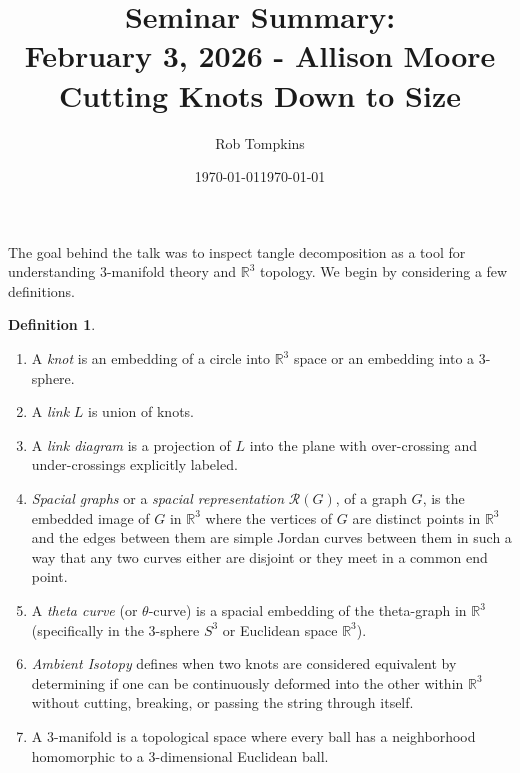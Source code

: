 \documentclass[12pt]{amsart}
\title{Seminar Summary:\\February 3, 2026 - Allison Moore\\Cutting Knots Down to Size}
\author{Rob Tompkins}
\date{\today}
\theoremstyle{definition}
\newtheorem{definition}{Definition}
\begin{document}
    \maketitle
    \date{\today}
    \begin{onehalfspace}
        The goal behind the talk was to inspect tangle decomposition as a tool for understanding 3-manifold theory
        and $\mathbb{R}^3$ topology.
        We begin by considering a few definitions.

        \begin{definition}\;
            \begin{enumerate}[i]
                \item A \emph{knot} is an embedding of a circle into $\mathbb{R}^3$ space or an embedding into a 3-sphere.
                \item A \emph{link} $L$ is union of knots.
                \item A \emph{link diagram} is a projection of $L$ into the plane with over-crossing and under-crossings
                      explicitly labeled.
                \item \emph{Spacial graphs} or a \emph{spacial representation} $\mathcal{R}(G)$, of a graph $G$, is the
                      embedded image of $G$ in $\mathbb{R}^3$ where the vertices of $G$ are distinct points in
                      $\mathbb{R}^3$ and the edges between them are simple Jordan curves between them in such a way that
                      any two curves either are disjoint or they meet in a common end point.
                \item A \emph{theta curve} (or $\theta$-curve) is a spacial embedding of the theta-graph in
                      $\mathbb{R}^3$ (specifically in the 3-sphere $S^3$ or Euclidean space $\mathbb{R}^3$).
                \item \emph{Ambient Isotopy} defines when two knots are considered equivalent by determining if one can
                      be continuously deformed into the other within $\mathbb{R}^3$ without cutting, breaking, or
                      passing the string through itself.
                \item A 3-manifold is a topological space where every ball has a neighborhood homomorphic to a
                      3-dimensional Euclidean ball.
            \end{enumerate}
        \end{definition}


\end{onehalfspace}
\end{document}
